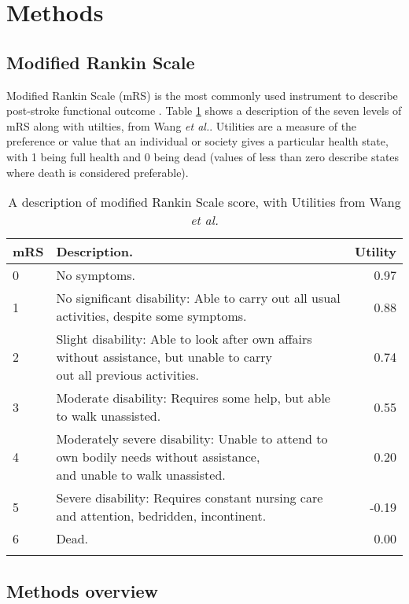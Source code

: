 \section{Methods}

\subsection{Modified Rankin Scale}

Modified Rankin Scale (mRS) is the most commonly used instrument to describe post-stroke functional outcome \cite{quinn_functional_2009}. Table \ref{tab:mrs} shows a description of the seven levels of mRS along with utilties, from Wang \emph{et al.}\cite{wang_utility-weighted_2020}. Utilities are a measure of the preference or value that an individual or society gives a particular health state, with 1 being full health and 0 being dead (values of less than zero describe states where death is considered preferable).

\begin{minipage}{\textwidth}
\renewcommand*{\arraystretch}{2.0} %
\begin{longtable}[]{@{}llr@{}}
\caption{A description of modified Rankin Scale score, with Utilities from Wang \emph{et al.}\cite{wang_utility-weighted_2020}}\\
\toprule
mRS & Description. & Utility\tabularnewline
\midrule
\endhead
0 & No symptoms. & 0.97\tabularnewline
1 & No significant disability: Able to carry out all usual activities,
despite some symptoms. & 0.88\tabularnewline
2 & \makecell[l]{Slight disability: Able to look after own affairs without assistance, but unable to carry \\ out all previous activities.} &
0.74\tabularnewline
3 & Moderate disability: Requires some help, but able to walk
unassisted. & 0.55\tabularnewline
4 & \makecell[l]{Moderately severe disability: Unable to attend to own bodily needs without assistance, \\ and unable to walk unassisted.} & 0.20\tabularnewline
5 & Severe disability: Requires constant nursing care and attention,
bedridden, incontinent. & -0.19\tabularnewline
6 & Dead. & 0.00\tabularnewline
\bottomrule
\label{tab:mrs}
\end{longtable}
\end{minipage}

\subsection{Methods overview}

